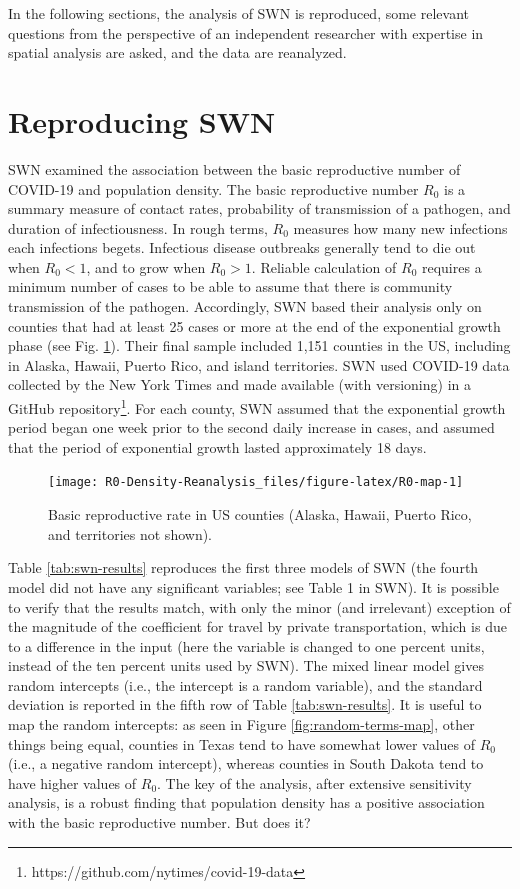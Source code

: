 \documentclass[]{elsarticle} %
\begin{document}
In the following sections, the analysis of SWN is reproduced, some
relevant questions from the perspective of an independent researcher
with expertise in spatial analysis are asked, and the data are
reanalyzed.

\hypertarget{reproducing-swn}{%
\section{Reproducing SWN}\label{reproducing-swn}}

SWN examined the association between the basic reproductive number of
COVID-19 and population density. The basic reproductive number \(R_0\)
is a summary measure of contact rates, probability of transmission of a
pathogen, and duration of infectiousness. In rough terms, \(R_0\)
measures how many new infections each infections begets. Infectious
disease outbreaks generally tend to die out when \(R_0<1\), and to grow
when \(R_0>1\). Reliable calculation of \(R_0\) requires a minimum
number of cases to be able to assume that there is community
transmission of the pathogen. Accordingly, SWN based their analysis only
on counties that had at least 25 cases or more at the end of the
exponential growth phase (see Fig. \ref{fig:R0-map}). Their final sample
included 1,151 counties in the US, including in Alaska, Hawaii, Puerto
Rico, and island territories. SWN used COVID-19 data collected by the
New York Times and made available (with versioning) in a GitHub
repository\footnote{https://github.com/nytimes/covid-19-data}. For each
county, SWN assumed that the exponential growth period began one week
prior to the second daily increase in cases, and assumed that the period
of exponential growth lasted approximately 18 days.

\begin{figure}
\texttt{[image: R0-Density-Reanalysis\_files/figure-latex/R0-map-1]} \caption{\label{fig:R0-map}Basic reproductive rate in US counties (Alaska, Hawaii, Puerto Rico, and territories not shown).}\label{fig:R0-map}
\end{figure}

Table \ref{tab:swn-results} reproduces the first three models of SWN
(the fourth model did not have any significant variables; see Table 1 in
SWN). It is possible to verify that the results match, with only the
minor (and irrelevant) exception of the magnitude of the coefficient for
travel by private transportation, which is due to a difference in the
input (here the variable is changed to one percent units, instead of the
ten percent units used by SWN). The mixed linear model gives random
intercepts (i.e., the intercept is a random variable), and the standard
deviation is reported in the fifth row of Table \ref{tab:swn-results}.
It is useful to map the random intercepts: as seen in Figure
\ref{fig:random-terms-map}, other things being equal, counties in Texas
tend to have somewhat lower values of \(R_0\) (i.e., a negative random
intercept), whereas counties in South Dakota tend to have higher values
of \(R_0\). The key of the analysis, after extensive sensitivity
analysis, is a robust finding that population density has a positive
association with the basic reproductive number. But does it?
\end{document}
